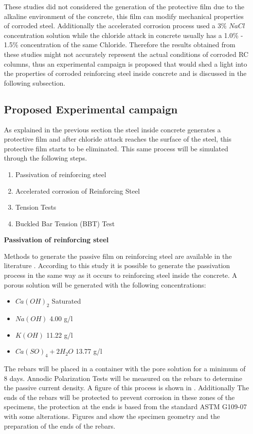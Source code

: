 These studies did not considered the generation of the protective film due to the alkaline environment of the concrete, this film can modify mechanical properties of corroded steel. Additionally the accelerated corrosion process used a 3\% $NaCl$ concentration solution while the chloride attack in concrete usually has a 1.0\% - 1.5\% concentration of the same Chloride. Therefore the results obtained from these studies might not accurately represent the actual conditions of corroded RC columns, thus an experimental campaign is proposed that would shed a light into the properties of corroded reinforcing steel inside concrete and is discussed in the following subsection.

\subsection{Proposed Experimental campaign}

As explained in the previous section the steel inside concrete generates a protective film and after chloride attack reaches the surface of the steel, this protective film starts to be eliminated. This same process will be simulated through the following steps.
\begin{enumerate}
	\item Passivation of reinforcing steel
	\item Accelerated corrosion  of Reinforcing Steel
	\item Tension Tests
	\item Buckled Bar Tension (BBT) Test
\end{enumerate}

\textbf{Passivation of reinforcing steel}

Methods to generate the passive film on reinforcing steel are available in the literature \cite{Ghods2010}. According to this study it is possible to generate the passivation process in the same way as it occurs to reinforcing steel inside the concrete. A porous solution will be generated with the following concentrations:

\begin{itemize}
	\item $Ca(OH)_2$ Saturated
	\item $Na(OH)$ 4.00 g/l
	\item $K(OH)$ 11.22 g/l
	\item $Ca(SO)_4 + 2H_2O$ 13.77 g/l
\end{itemize}

The rebars will be placed in a container with the pore solution for a minimum of 8 days. Annodic Polarization Tests will be measured on the rebars to determine the passive current density. A figure of this process is shown in . Additionally The ends of the rebars will be protected to prevent corrosion in these zones of the specimens, the protection at the ends is based from the standard ASTM G109-07 with some alterations. Figures  and  show the specimen geometry and the preparation of the ends of the rebars.

